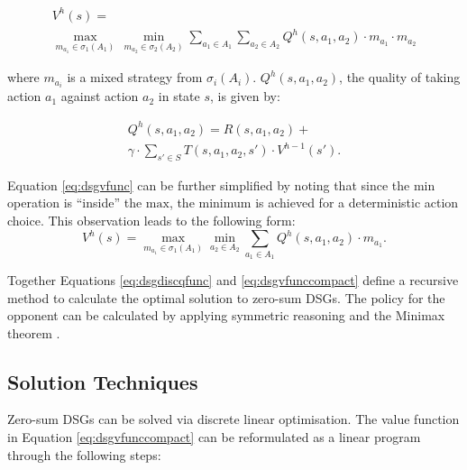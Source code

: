 {\small
\abovedisplayskip=0pt
\belowdisplayskip=0pt
\begin{multline}
\label{eq:dsgvfunc}
  V^{h}(s) = \\
  \max_{m_{a_{1}} \in \sigma_1(A_1)} \hspace{2pt} \min_{m_{a_{2}} \in \sigma_2(A_2)} \sum_{a_1 \in A_1} \sum_{a_2 \in A_2} Q^{h}(s, a_1, a_2) \cdot m_{a_{1}} \cdot m_{a_{2}}
\end{multline}
}%

where $m_{a_i}$ is a mixed strategy from $\sigma_i(A_i)$. 
$Q^{h}(s, a_1, a_2)$, the quality of taking action $a_1$ against action $a_2$ in state $s$,
is given by:

{\small 
\abovedisplayskip=0pt
\belowdisplayskip=0pt
\begin{multline}
\label{eq:dsgdiscqfunc}
  Q^{h}(s, a_1, a_2) = R(s, a_1, a_2) + \\
  \gamma \cdot \sum_{s' \in S} T(s, a_1, a_2, s') \cdot V^{h-1}(s').
\end{multline}
}%

Equation \eqref{eq:dsgvfunc} can be further simplified by noting that
since the $\text{min}$ operation is ``inside'' the $\text{max}$, the minimum is achieved
for a deterministic action choice. This observation leads to the following
form:
{\small 
\abovedisplayshortskip =100pt
\belowdisplayshortskip =0pt
\begin{equation}
\label{eq:dsgvfunccompact}
  V^{h}(s) = \max_{m_{a_{1}} \in \sigma_1(A_1)} \min_{a_2 \in A_2} \sum_{a_1 \in A_1} Q^{h}(s, a_1, a_2) \cdot m_{a_1}.
\end{equation}
}%

Together Equations \eqref{eq:dsgdiscqfunc} and \eqref{eq:dsgvfunccompact}
define a recursive method to calculate the optimal solution to zero-sum
DSGs. The policy for the opponent can be calculated by applying symmetric
reasoning and the Minimax theorem \cite{Neumann_MA_1928}. 

\subsection{Solution Techniques}
\label{subsec:dsgsolution}

Zero-sum DSGs can be solved via discrete linear optimisation. The value
function in Equation \eqref{eq:dsgvfunccompact} can be reformulated as a linear
program through the following steps:

